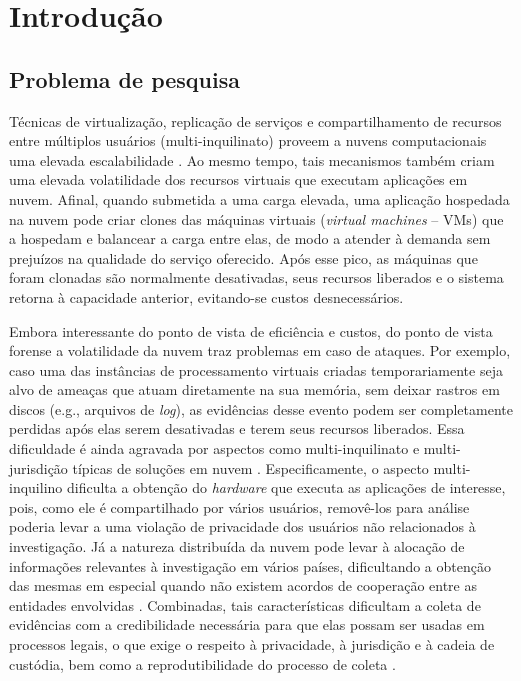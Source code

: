\chapter{Introdução}

\section{Problema de pesquisa}

%
Técnicas de virtualização, replicação de serviços e compartilhamento de recursos entre múltiplos usuários (multi-inquilinato) proveem a nuvens computacionais uma elevada escalabilidade \cite{MorsyCloudSecurity:2010}.
%
Ao mesmo tempo, tais mecanismos também criam uma elevada volatilidade dos recursos virtuais que executam aplicações em nuvem.
%
Afinal, quando submetida a uma carga elevada, uma aplicação hospedada na nuvem pode criar clones das máquinas virtuais (\textit{virtual machines} -- VMs) que a hospedam e balancear a carga entre elas, de modo a atender à demanda sem prejuízos na qualidade do serviço oferecido. 
%
Após esse pico, as máquinas que foram clonadas são normalmente desativadas, seus recursos liberados e o sistema retorna à capacidade anterior, evitando-se custos desnecessários.


%
Embora interessante do ponto de vista de eficiência e custos, do ponto de vista forense a volatilidade da nuvem traz problemas em caso de ataques.
%
Por exemplo, caso uma das instâncias de processamento virtuais criadas temporariamente seja alvo de ameaças que atuam diretamente na sua memória, sem deixar rastros em discos (e.g., arquivos de \textit{log}), as evidências desse evento podem ser completamente perdidas após elas serem desativadas e terem seus recursos liberados.
%
Essa dificuldade é ainda agravada por aspectos como multi-inquilinato e multi-jurisdição típicas de soluções em nuvem \cite{BashAdvInForensics:2015}.
%
Especificamente, o aspecto multi-inquilino dificulta a obtenção do \textit{hardware} que executa as aplicações de interesse, pois, como ele é compartilhado por vários usuários, removê-los para análise poderia levar a uma violação de privacidade dos usuários não relacionados à investigação. 
%
Já a natureza distribuída da nuvem pode levar à alocação de informações relevantes à investigação em vários países, dificultando a obtenção das mesmas em especial quando não existem acordos de cooperação entre as entidades envolvidas \cite{DykstraAcquiringForIAAS:2012}.
%
Combinadas, tais características dificultam a coleta de evidências com a credibilidade necessária para que elas possam ser usadas em processos legais,  o que exige o respeito à privacidade, à jurisdição e à cadeia de custódia, bem como a reprodutibilidade do processo de coleta \cite{RahmanLiveForensicsTechniques:2015}.

